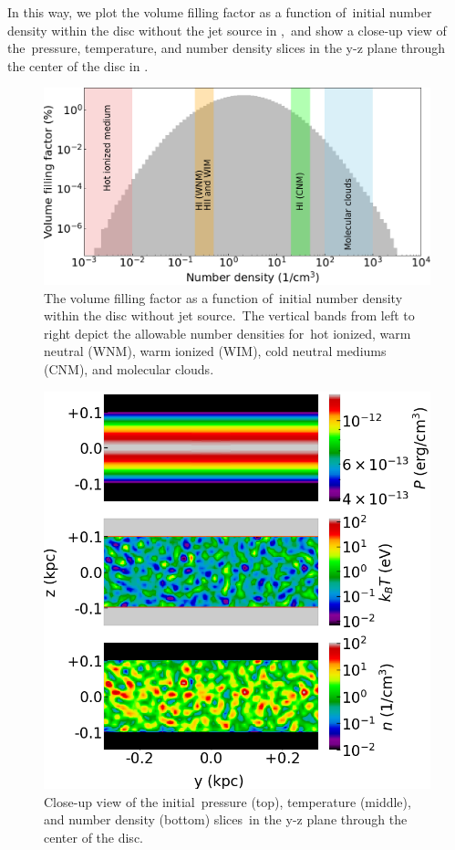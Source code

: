 \documentclass[twocolumn]{aastex631}
\begin{document}
  In this way, we plot the volume filling factor as a function of\
  initial number density within the disc without the jet source in ,\
  and show a close-up view of the\
  pressure, temperature, and number density slices
  in the y-z plane through the center of the disc in \Cref{fig__zoom-in-disc} .

  \begin{figure}
      \includegraphics[width=\columnwidth]{figures/fig__numberDensityHistogram.png}
    \caption{The volume filling factor as a function of\
             initial number density within the disc without jet source.\
             The vertical bands from left to right depict the allowable number densities \citep{peak-ism-density} for\
             hot ionized, warm neutral (WNM), warm ionized (WIM), cold neutral mediums (CNM), and molecular clouds.}
      \label{fig__numberDensityHistogram}
  \end{figure}

  \begin{figure}
    \includegraphics[width=\columnwidth]{figures/fig__zoom-in-disc.png}
    \caption{Close-up view of the initial\
             pressure (top), temperature (middle), and number density (bottom) slices\
             in the y-z plane through the center of the disc.
             }
    \label{fig__zoom-in-disc}
  \end{figure}
\end{document}
